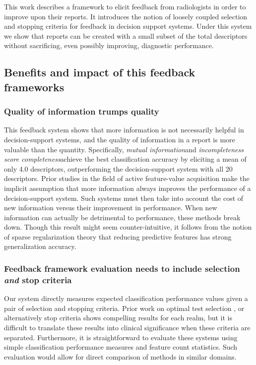 This work describes a framework to elicit feedback from radiologists in order to improve upon their reports. It introduces the notion of loosely coupled selection and stopping criteria for feedback in decision support systems. Under this system we show that reports can be created with a small subset of the total descriptors without sacrificing, even possibly improving, diagnostic performance.

\subsection{Benefits and impact of this feedback frameworks}

\subsubsection{Quality of information trumps quality}
This feedback system shows that more information is not necessarily helpful in decision-support systems, and the quality of information in a report is more valuable than the quantity. Specifically, \emph{mutual information}and \emph{incompleteness score completeness}achieve the best classification accuracy by eliciting a mean of only 4.0 descriptors, outperforming the decision-support system with all 20 descriptors. Prior studies in the field of active feature-value acquisition make the implicit assumption that more information always improves the performance of a decision-support system. Such systems must then take into account the cost of new information versus their improvement in performance. When new information can actually be detrimental to performance, these methods break down. Though this result might seem counter-intuitive, it follows from the notion of sparse regularization theory that reducing predictive features has strong generalization accuracy.


\subsubsection{Feedback framework evaluation needs to include selection \emph{and} stop criteria}
Our system directly measures expected classification performance values given a pair of selection and stopping criteria. Prior work on  optimal test selection \cite{Greiner:2002wr,Madigan:1996cv, Krause:2005tr}, or alternatively stop criteria \cite{Gaag:2011gs} shows compelling results for each realm, but it is difficult to translate these results into clinical significance when these criteria are separated. Furthermore, it is straightforward to evaluate these systems using simple classification performance measures and feature count statistics. Such evaluation would allow for direct comparison of methods in similar domains.


